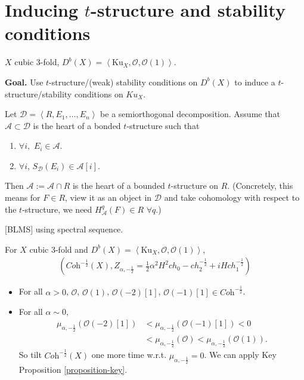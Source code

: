 \section{Inducing $t$-structure and stability conditions}
\label{section-inducing-t-structure-and-stability-conditions}

\begin{example}
\label{example-cubic-3-fold}
$X$ cubic 3-fold, $D^b(X)=\left<\text{Ku}_X,\mathcal{O},\mathcal{O}(1)\right>$.
\end{example}

\noindent
{\bf Goal.} Use $t$-structure/(weak) stability conditions on $D^b(X)$ to induce
a $t$-structure/stability conditions on $Ku_X$.

\medskip\noindent
\begin{proposition}
\label{proposition-key}
Let $\mathcal{D}=\left<R,E_1,\ldots,E_n\right>$ be a semiorthogonal
decomposition. Assume that $\mathcal{A} \subset \mathcal{D}$ is the heart of a
bonded $t$-structure such that
\begin{enumerate}
\item $\forall i,$ $E_i \in \mathcal{A}$.
\item $\forall i$, $S_{\mathcal{D}}(E_i) \in \mathcal{A}[i]$.
\end{enumerate}
Then $\mathcal{A}:=\mathcal{A}\cap R$ is the heart of a bounded $t$-structure on
$R$. (Concretely, this means for $F \in R$, view it as an object in
$\mathcal{D}$ and take cohomology with respect to the $t$-structure, we need
$H_{\mathcal{A}}^q(F) \in R$ $\forall q$.)
\end{proposition}

[BLMS] using spectral sequence.

\begin{example}
\label{example-cubic-3-fold-continued}
For $X$ cubic 3-fold and
$D^b(X)=\left<\text{Ku}_X,\mathcal{O},\mathcal{O}(1)\right>$,
\begin{align*}
\left(\textit{Coh}^{-\frac{1}{2}}(X),Z_{\alpha,-\frac{1}{2}}
=\frac{1}{2}\alpha^2H^2 ch_0 -ch_2^{-\frac{1}{2}}+iHch_1^{-\frac{1}{2}}\right)
\end{align*}
\end{example}

\begin{exercise}
\label{exercise-}
\begin{itemize}
\item For all $\alpha>0$, $\mathcal{O}$, $\mathcal{O}(1)$, $\mathcal{O}(-2)[1]$, 
$\mathcal{O}(-1)[1]\in \textit{Coh}^{-\frac{1}{2}}$.
\item For all $\alpha \sim 0$,
\begin{align*}
\mu_{\alpha,-\frac{1}{2}}(\mathcal{O}(-2)[1])
&<\mu_{\alpha,-\frac{1}{2}}(\mathcal{O}(-1)[1])<0\\
&<\mu_{\alpha,-\frac{1}{2}}(\mathcal{O})
<\mu_{\alpha,-\frac{1}{2}}(\mathcal{O}(1)).
\end{align*}
So tilt $\textit{Coh}^{-\frac{1}{2}}(X)$ one more time w.r.t.
$\mu_{\alpha,-\frac{1}{2}}=0$. We can apply Key Proposition 
\ref{proposition-key}.
\end{itemize}
\end{exercise}

